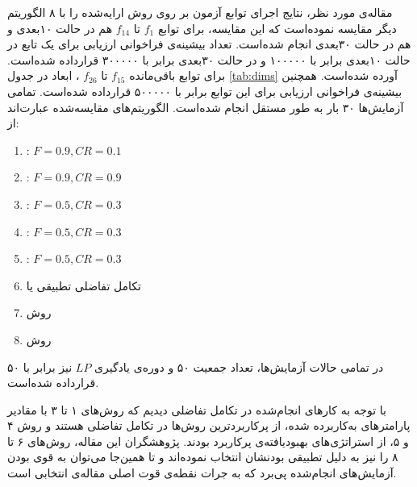 \documentclass[12pt,a4paper]{article}
\theoremstyle{definition}
\theoremstyle{theorem}
\theoremstyle{definition}
\begin{document}
مقاله‌ی مورد نظر، نتایج اجرای توابع آزمون بر روی روش ارایه‌شده را با ۸ الگوریتم دیگر مقایسه نموده‌است که این مقایسه، برای توابع 
$f_1$
تا 
$f_{14}$
هم در حالت ۱۰بعدی و هم در حالت ۳۰بعدی انجام شده‌است. تعداد بیشینه‌ی فراخوانی ارزیابی‌ برای یک تابع  در حالت ۱۰بعدی برابر با ۱۰۰۰۰۰ و در حالت ۳۰بعدی برابر با ۳۰۰۰۰۰ قرارداده‌ شده‌است. برای توابع باقی‌مانده
$f_{15}$
تا 
$f_{26}$
، ابعاد در جدول \ref{tab:dims} آورده شده‌است. همچنین بیشینه‌ی فراخوانی ارزیابی برای این توابع برابر با ۵۰۰۰۰۰ قرارداده شده‌است. تمامی آزمایش‌ها ۳۰ بار به طور مستقل انجام شده‌است. الگوریتم‌های مقایسه‌شده عبارت‌اند از: 
\begin{enumerate}
\item
{} : $F = 0.9, CR = 0.1$

\item
{} : $F = 0.9, CR = 0.9$

\item
{} : $F = 0.5, CR = 0.3$

\item
{} : $F = 0.5, CR = 0.3$

\item
{} : $F = 0.5, CR = 0.3$

\item
تکامل تفاضلی تطبیقی یا
 \cite{demon4}

\item
روش 
 \cite{27}

\item
روش
 \cite{28}
\end{enumerate}


در تمامی حالات آزمایش‌ها، تعداد جمعیت ۵۰ و دوره‌ی یادگیری
$\mathit{LP}$
نیز برابر با ۵۰ قرارداده شده‌است. 

با توجه به کارهای انجام‌شده در تکامل تفاضلی دیدیم که روش‌های ۱ تا ۳ با مقادیر پارامترهای به‌کاربرده شده، از پرکاربردترین روش‌ها در تکامل تفاضلی هستند و روش ۴ و ۵، از استراتژی‌های بهبودیافته‌ی پرکاربرد بودند. پژوهشگران این مقاله، روش‌های ۶ تا ۸ را نیز به دلیل تطبیقی بودنشان انتخاب نموده‌اند و تا همین‌جا می‌توان به قوی بودن آزمایش‌های انجام‌شده پی‌برد که به جرات نقطه‌ی قوت اصلی مقاله‌ی انتخابی است. 
\end{document}
